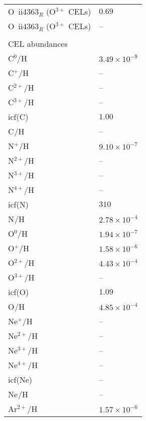 \begin{longtable}[l]{ll}
 O~{\sc ii}4363$_R$ (O$^{3+}$ CELs)  & $  0.69$\\
 O~{\sc ii}4363$_R$ (O$^{3+}$ CELs)  & -- \\
 \vspace{0.2cm}\\\multicolumn{2}{l}{CEL abundances}\\ \hline
 C$^{0}$/H                           & $  3.49\times 10^{ -9}$\\
 C$^{+}$/H                           & -- \\
 C$^{2+}$/H                          & -- \\
 C$^{3+}$/H                          & -- \\
 icf(C)                              & $  1.00$\\
 C$^{}$/H                            & -- \\
 N$^{+}$/H                           & $  9.10\times 10^{ -7}$\\
 N$^{2+}$/H                          & -- \\
 N$^{3+}$/H                          & -- \\
 N$^{4+}$/H                          & -- \\
 icf(N)                              & $  310$\\
 N$^{}$/H                            & $  2.78\times 10^{ -4}$\\
 O$^{0}$/H                           & $  1.94\times 10^{ -7}$\\
 O$^{+}$/H                           & $  1.58\times 10^{ -6}$\\
 O$^{2+}$/H                          & $  4.43\times 10^{ -4}$\\
 O$^{3+}$/H                          & -- \\
 icf(O)                              & $  1.09$\\
 O$^{}$/H                            & $  4.85\times 10^{ -4}$\\
 Ne$^{+}$/H                          & -- \\
 Ne$^{2+}$/H                         & -- \\
 Ne$^{3+}$/H                         & -- \\
 Ne$^{4+}$/H                         & -- \\
 icf(Ne)                             & -- \\
 Ne$^{}$/H                           & -- \\
 Ar$^{2+}$/H                         & $  1.57\times 10^{ -6}$\\

\end{longtable}
